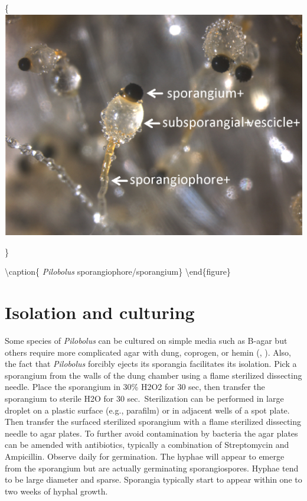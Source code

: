 \documentclass[]{book}
\begin{document}
\{\centering \includegraphics[width=15.45in]{img/Ch9_Fig4}

\}

\textbackslash caption\{ \emph{Pilobolus} sporangiophore/sporangium\}\label{fig:ch9fig4}
\textbackslash end\{figure\}

\hypertarget{isolation-and-culturing}{%
\section{Isolation and culturing}\label{isolation-and-culturing}}

Some species of \emph{Pilobolus} can be cultured on simple media such as B-agar but others require more complicated agar with dung, coprogen, or hemin (\citet{Hesseltine_1953}, \citet{Levetin_1976}). Also, the fact that \emph{Pilobolus} forcibly ejects its sporangia facilitates its isolation. Pick a sporangium from the walls of the dung chamber using a flame sterilized dissecting needle. Place the sporangium in 30\% H2O2 for 30 sec, then transfer the sporangium to sterile H2O for 30 sec.~Sterilization can be performed in large droplet on a plastic surface (e.g., parafilm) or in adjacent wells of a spot plate. Then transfer the surfaced sterilized sporangium with a flame sterilized dissecting needle to agar plates. To further avoid contamination by bacteria the agar plates can be amended with antibiotics, typically a combination of Streptomycin and Ampicillin. Observe daily for germination. The hyphae will appear to emerge from the sporangium but are actually germinating sporangiospores. Hyphae tend to be large diameter and sparse. Sporangia typically start to appear within one to two weeks of hyphal growth.
\end{document}
